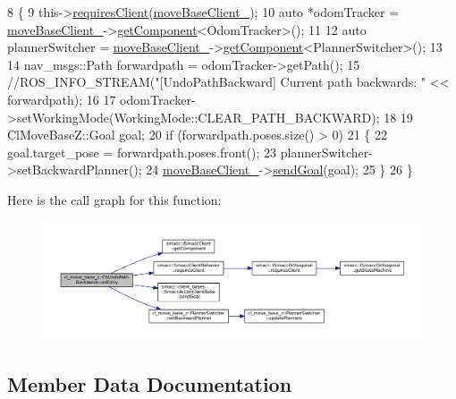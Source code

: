 \begin{DoxyCode}
8 \{
9     this->\hyperlink{classsmacc_1_1SmaccClientBehavior_a917f001e763a1059af337bf4e164f542}{requiresClient}(\hyperlink{classcl__move__base__z_1_1CbUndoPathBackwards_a306d616dab00f50141abed4bfb47aeb2}{moveBaseClient\_});
10     \textcolor{keyword}{auto} *odomTracker = \hyperlink{classcl__move__base__z_1_1CbUndoPathBackwards_a306d616dab00f50141abed4bfb47aeb2}{moveBaseClient\_}->\hyperlink{classsmacc_1_1ISmaccClient_adef78db601749ca63c19e74a27cb88cc}{getComponent}<OdomTracker>();
11 
12     \textcolor{keyword}{auto} plannerSwitcher = \hyperlink{classcl__move__base__z_1_1CbUndoPathBackwards_a306d616dab00f50141abed4bfb47aeb2}{moveBaseClient\_}->\hyperlink{classsmacc_1_1ISmaccClient_adef78db601749ca63c19e74a27cb88cc}{getComponent}<PlannerSwitcher>();
13 
14     nav\_msgs::Path forwardpath = odomTracker->getPath();
15     \textcolor{comment}{//ROS\_INFO\_STREAM("[UndoPathBackward] Current path backwards: " << forwardpath);}
16 
17     odomTracker->setWorkingMode(WorkingMode::CLEAR\_PATH\_BACKWARD);
18 
19     ClMoveBaseZ::Goal goal;
20     \textcolor{keywordflow}{if} (forwardpath.poses.size() > 0)
21     \{
22         goal.target\_pose = forwardpath.poses.front();
23         plannerSwitcher->setBackwardPlanner();
24         \hyperlink{classcl__move__base__z_1_1CbUndoPathBackwards_a306d616dab00f50141abed4bfb47aeb2}{moveBaseClient\_}->\hyperlink{classsmacc_1_1client__bases_1_1SmaccActionClientBase_a9c47a5094ac8afb01680307fe5eca922}{sendGoal}(goal);
25     \}
26 \}
\end{DoxyCode}


Here is the call graph for this function\+:
\nopagebreak
\begin{figure}[H]
\begin{center}
\leavevmode
\includegraphics[width=350pt]{classcl__move__base__z_1_1CbUndoPathBackwards_a32e680530375b62c7053bf173f6b2b1b_cgraph}
\end{center}
\end{figure}




\subsection{Member Data Documentation}
